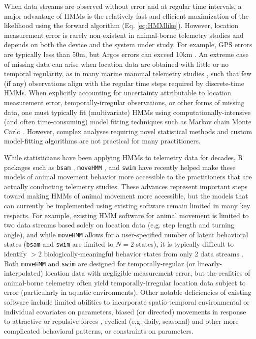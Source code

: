 \documentclass[12pt]{article}\usepackage[]{graphicx}\usepackage[]{xcolor}
\begin{document}
When data streams are observed without error and at regular time intervals, a major advantage of HMMs is the relatively fast and efficient maximization of the likelihood using the forward algorithm (Eq. \ref{eq:HMMlike}).  However, location measurement error is rarely non-existent in animal-borne telemetry studies and depends on both the device and the system under study.  For example, GPS errors are typically less than 50m, but Argos errors can exceed 10km \citep[e.g.][]{CostaEtAl2010}.  An extreme case of missing data can arise when location data are obtained with little or no temporal regularity, as in many marine mammal telemetry studies \citep[e.g.][]{JonsenEtAl2005}, such that few (if any) observations align with the regular time steps required by discrete-time HMMs. When explicitly accounting for uncertainty attributable to location measurement error, temporally-irregular observations, or other forms of missing data, one must typically fit (multivariate) HMMs using computationally-intensive (and often time-consuming) model fitting techniques such as Markov chain Monte Carlo \citep{JonsenEtAl2005,McClintockEtAl2012}.  However, complex analyses requiring novel statistical methods and custom model-fitting algorithms are not practical for many practitioners.

While statisticians have been applying HMMs to telemetry data for decades, R \citep{RCoreTeam2017} packages such as \verb|bsam| \citep{JonsenEtAl2005}, \verb|moveHMM| \citep{MichelotEtAl2016}, and \verb|swim| \citep{WhoriskeyEtAl2017} have recently helped make these models of animal movement behavior more accessible to the practitioners that are actually conducting telemetry studies.  These advances represent important steps toward making HMMs of animal movement more accessible, but the models that can currently be implemented using existing software remain limited in many key respects. For example, existing HMM software for animal movement is limited to two data streams based solely on location data (e.g. step length and turning angle), and while \verb|moveHMM| allows for a user-specified number of latent behavioral states (\verb|bsam| and \verb|swim| are limited to $N=2$ states), it is typically difficult to identify $>$2 biologically-meaningful behavior states from only 2 data streams \citep[e.g.][]{MoralesEtAl2004,BeyerEtAl2013,McClintockEtAl2014b}. Both \verb|moveHMM| and \verb|swim| are designed for temporally-regular (or linearly-interpolated) location data with negligible measurement error, but the realities of animal-borne telemetry often yield temporally-irregular location data subject to error (particularly in aquatic environments). Other notable deficiencies of existing software include limited abilities to incorporate spatio-temporal environmental or individual covariates on parameters, biased (or directed) movements in response to attractive or repulsive forces \citep[e.g.][]{McClintockEtAl2012,LangrockEtAl2014}, cyclical (e.g. daily, seasonal) and other more complicated behavioral patterns, or constraints on parameters. 
\end{document}
